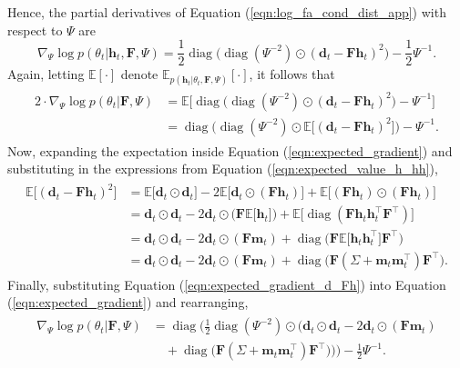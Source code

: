 \documentclass[msc,deptreport.inf]{infthesis} %
\newcommand{\matr}[1]{\mathbf{#1}}
\newcommand{\E}{\mathbb E}
\newcommand{\diag}{\mathop{\mathrm{diag}}}
\begin{document}
Hence, the partial derivatives of Equation (\ref{eqn:log_fa_cond_dist_app}) with respect to $\Psi$ are
\begin{equation}
	\nabla_{\Psi} \log p(\theta_t | \matr{h}_t, \matr{F}, \Psi)
	= \frac{1}{2} \diag\big(\diag(\Psi^{-2}) \odot (\matr{d}_t - \matr{Fh}_t)^2\big) - \frac{1}{2}\Psi^{-1}.
\end{equation}
Again, letting $\E[\cdot]$ denote $\E_{p(\matr{h}_t | \theta_t, \matr{F}, \Psi)}[\cdot]$, it follows that
\begin{align}\label{eqn:expected_gradient}
\begin{split}
	2 \cdot \nabla_{\Psi} \log p(\theta_t | \matr{F}, \Psi) 
	& = \E \big[ \diag\big(\diag(\Psi^{-2}) \odot (\matr{d}_t - \matr{Fh}_t)^2\big) - \Psi^{-1} \big] \\
	& = \diag\Big(\diag(\Psi^{-2}) \odot \E \big[(\matr{d}_t - \matr{Fh}_t)^2\big]\Big) - \Psi^{-1}.
\end{split}
\end{align} 
Now, expanding the expectation inside Equation (\ref{eqn:expected_gradient}) and substituting in the expressions from Equation (\ref{eqn:expected_value_h_hh}),
\begin{align}\label{eqn:expected_gradient_d_Fh}
\begin{split}
	\E \big[(\matr{d}_t - \matr{Fh}_t)^2\big] 
	& = \E \big[\matr{d}_t \odot \matr{d}_t \big] - 2\E \big[ \matr{d}_t \odot (\matr{Fh}_t) \big] + \E \big[ (\matr{Fh}_t) \odot (\matr{Fh}_t) \big] \\
	& = \matr{d}_t \odot \matr{d}_t - 2\matr{d}_t \odot \big(\matr{F} \E \big[ \matr{h}_t \big]\big) + \E \big[ \diag(\matr{F}\matr{h}_t \matr{h}_t^\intercal  \matr{F}^\intercal) \big] \\
	& = \matr{d}_t \odot \matr{d}_t - 2\matr{d}_t \odot (\matr{F} \matr{m}_t) + \diag\big( \matr{F} \E \big[ \matr{h}_t \matr{h}_t^\intercal \big] \matr{F}^\intercal \big) \\
	& = \matr{d}_t \odot \matr{d}_t - 2\matr{d}_t \odot (\matr{F} \matr{m}_t) + \diag\big( \matr{F} (\Sigma + \matr{m}_t \matr{m}_t^\intercal) \matr{F}^\intercal \big).
\end{split}
\end{align} 
Finally, substituting Equation (\ref{eqn:expected_gradient_d_Fh}) into Equation (\ref{eqn:expected_gradient}) and rearranging, 
\begin{align}
\begin{split}
	\nabla_{\Psi} \log p(\theta_t | \matr{F}, \Psi) 
	& = \diag\Bigg(\frac{1}{2} \diag(\Psi^{-2}) \odot \Big(\matr{d}_t \odot \matr{d}_t - 2\matr{d}_t \odot (\matr{F} \matr{m}_t) \\
	& \quad + \diag\big( \matr{F} (\Sigma + \matr{m}_t \matr{m}_t^\intercal) \matr{F}^\intercal \big) \Big) \Bigg)
	 - \frac{1}{2} \Psi^{-1}.
\end{split}
\end{align} 
\end{document}
